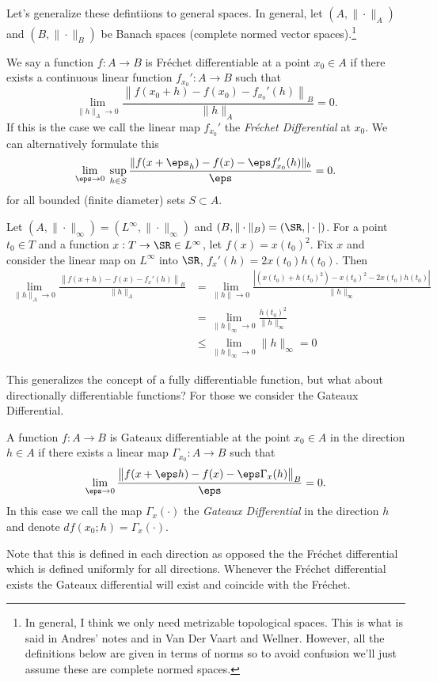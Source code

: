 Let's generalize these defintiions to general spaces. In general, let \((A,\|\cdot\|_A)\) and \((B,\|\cdot\|_B)\) be Banach spaces (complete normed vector spaces).\footnote{In general, I think we only need metrizable topological spaces. This is what is said in Andres' notes and in Van Der Vaart and Wellner. However, all the definitions below are given in terms of norms so to avoid confusion we'll just assume these are complete normed spaces.} 

\begin{definition}
	\label{def:frechet-differentiable}
	We say a function \(f:A\to B\) is Fréchet differentiable at a point \(x_0\in A\) if there exists a continuous linear function \(f_{x_0}':A\to B\) such that
	\[
		\lim_{\|h\|_A\to 0} \frac{\left\|f(x_0+h)-f(x_0)-f_{x_0}'(h)\right\|_B}{\|h\|_A} = 0 
	.\] 
	If this is the case we call the linear map \(f_{x_0}'\) the \textit{Fréchet Differential} at \(x_0\). 
	We can alternatively formulate this
	\[
		\lim_{\eps\to 0}\;\sup_{h\in S} \frac{\|f(x+\eps_h)-f(x)-\eps f_{x_0}'(h)\|_b}{\eps} = 0 
	.\] 
	for all bounded (finite diameter) sets \(S \subset A\).
\end{definition}
\begin{example*}
	Let \((A,\|\cdot\|_{\infty}) = (L^\infty, \|\cdot\|_\infty)\) and \((B,\|\cdot\|_{B}) = (\SR,|\cdot|)\). For a point \(t_0 \in T\) and a function \(x:T\to\SR \in L^\infty\), let \(f(x) = x(t_0)^2\). Fix \(x\) and consider the linear map on \(L^\infty\) into \(\SR\), \(f_x'(h) = 2x(t_0)h(t_0)\). Then
	\begin{align*}
		\lim_{ \|h\|_A\to 0} \frac{\left\|f(x+h)-f(x)-f_x'(h)\right\|_B}{\|h\|_A} &= \lim_{\|h\|\to 0}\frac{\left|\left(x(t_0)+h(t_0)^2\right)-x(t_0)^2 - 2x(t_0)h(t_0)\right|}{\|h\|_\infty}  	\\ 
		&= \lim_{\|h\|_\infty \to 0}\frac{h(t_0)^2}{\|h\|_\infty} \\
		&\leq \lim_{\|h\|_\infty\to0}\|h\|_\infty = 0
	\end{align*}
\end{example*}

This generalizes the concept of a fully differentiable function, but what about directionally differentiable functions? For those we consider the Gateaux Differential. 
\begin{definition}
	\label{def:gateaux-differential}
	A function \(f:A\to B\) is Gateaux differentiable at the point \(x_0\in A\) in the direction \(h\in A\) if there exists a linear map \(\Gamma_{x_0}:A\to B\) such that 
	\[
		\lim_{\eps\to0} \frac{\left\|f(x+\eps h)-f(x) - \eps\Gamma_x(h)\right\|_B}{\eps} = 0 
	.\] 
	In this case we call the map \(\Gamma_x(\cdot)\) the \textit{Gateaux Differential} in the direction \(h\) and denote \(df(x_0;h)=\Gamma_x(\cdot)\).
\end{definition}
Note that this is defined in each direction as opposed the the Fréchet differential which is defined uniformly for all directions. Whenever the Fréchet differential exists the Gateaux differential will exist and coincide with the Fréchet. 

